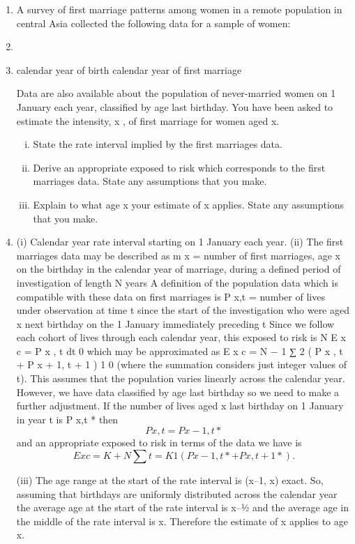 \documentclass[a4paper,12pt]{article}
\begin{document}
\begin{enumerate}

\item A survey of first marriage patterns among women in a remote population in central Asia collected the following data for a sample of women:
\item
\item

calendar year of birth
calendar year of first marriage

Data are also available about the population of never-married women on 1 January each year, classified by age last birthday.
You have been asked to estimate the intensity, \lambda x , of first marriage for women aged x.
\begin{enumerate}[(i)] 
\item State the rate interval implied by the first marriages data. 
\item Derive an appropriate exposed to risk which corresponds to the first marriages data. State any assumptions that you make. 
\item Explain to what age x your estimate of \lambda x applies. State any assumptions that you make.
\end{enumerate}

\item 
(i) Calendar year rate interval starting on 1 January each year.
(ii) The first marriages data may be described as m x = number of first marriages, age x on the birthday in the
calendar year of marriage, during a defined period of investigation of length N years A definition of the population data which is compatible with these data on first marriages is
P x,t = number of lives under observation at time t since the start of the investigation who were aged x next birthday on the 1 January
immediately preceding t Since we follow each cohort of lives through each calendar year, this exposed
to risk is
N
E x c
=
\int P x , t dt
0
which may be approximated as
E x c =
N − 1
∑ 2 ( P x , t + P x + 1, t + 1 )
1
0
(where the summation considers just integer values of t). This assumes that the population varies linearly across the
calendar year. However, we have data classified by age last birthday so we need to make a further adjustment.
If the number of lives aged x last birthday on 1 January in year t is P x,t * then
\[P x,t = P x-1,t *\]
and an appropriate exposed to risk in terms of the data we
have is
\[ E x c =
K + N
∑
t = K
1
( P x − 1, t * + P x , t + 1 * ) .\]

(iii)
The age range at the start of the rate interval is (x–1, x) exact.
So, assuming that birthdays are uniformly distributed across the calendar year the average age at the start of the rate interval is
x–1⁄2 and the average age in the middle of the rate interval is x.
Therefore the estimate of \lambda x applies to age x.
\end{enumerate}
\end{document}
